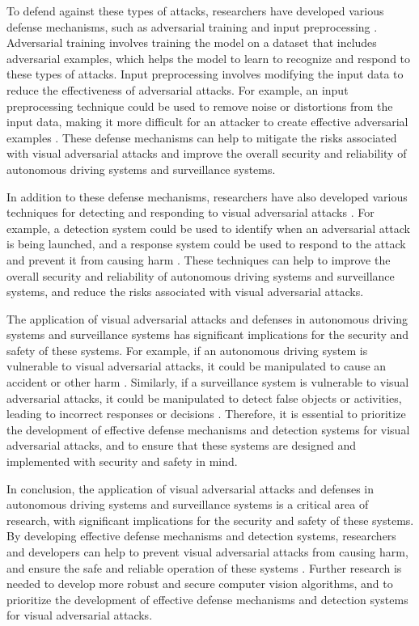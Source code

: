 \documentclass[11pt]{article}
\begin{document}
To defend against these types of attacks, researchers have developed various defense mechanisms, such as adversarial training and input preprocessing \cite{ref117}. Adversarial training involves training the model on a dataset that includes adversarial examples, which helps the model to learn to recognize and respond to these types of attacks. Input preprocessing involves modifying the input data to reduce the effectiveness of adversarial attacks. For example, an input preprocessing technique could be used to remove noise or distortions from the input data, making it more difficult for an attacker to create effective adversarial examples \cite{ref118}. These defense mechanisms can help to mitigate the risks associated with visual adversarial attacks and improve the overall security and reliability of autonomous driving systems and surveillance systems.

In addition to these defense mechanisms, researchers have also developed various techniques for detecting and responding to visual adversarial attacks \cite{ref119}. For example, a detection system could be used to identify when an adversarial attack is being launched, and a response system could be used to respond to the attack and prevent it from causing harm \cite{ref120}. These techniques can help to improve the overall security and reliability of autonomous driving systems and surveillance systems, and reduce the risks associated with visual adversarial attacks.

The application of visual adversarial attacks and defenses in autonomous driving systems and surveillance systems has significant implications for the security and safety of these systems. For example, if an autonomous driving system is vulnerable to visual adversarial attacks, it could be manipulated to cause an accident or other harm \cite{ref121}. Similarly, if a surveillance system is vulnerable to visual adversarial attacks, it could be manipulated to detect false objects or activities, leading to incorrect responses or decisions \cite{ref122}. Therefore, it is essential to prioritize the development of effective defense mechanisms and detection systems for visual adversarial attacks, and to ensure that these systems are designed and implemented with security and safety in mind.

In conclusion, the application of visual adversarial attacks and defenses in autonomous driving systems and surveillance systems is a critical area of research, with significant implications for the security and safety of these systems. By developing effective defense mechanisms and detection systems, researchers and developers can help to prevent visual adversarial attacks from causing harm, and ensure the safe and reliable operation of these systems \cite{ref123}. Further research is needed to develop more robust and secure computer vision algorithms, and to prioritize the development of effective defense mechanisms and detection systems for visual adversarial attacks.
\end{document}

